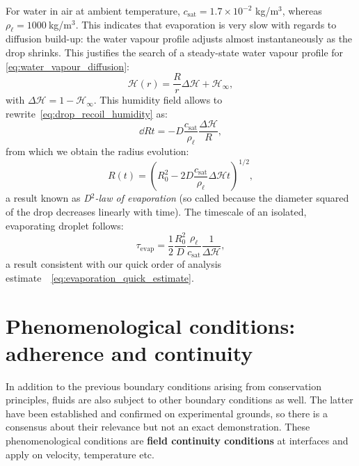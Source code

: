 For water in air at ambient temperature, $c_\text{sat} = 1.7 \times 10^{-2}$ kg/m$^3$, whereas $\rho_\ell = 1000~$kg/m$^3$. This indicates that evaporation is very slow with regards to diffusion build-up: the water vapour profile adjusts almost instantaneously as the drop shrinks. This justifies the search of a steady-state water vapour profile for \eqref{eq:water_vapour_diffusion}:
\begin{equation}
\mathcal H(r) = \frac{R}{r} \Delta \mathcal H + \mathcal H_\infty,
\end{equation}
with $\Delta \mathcal H = 1 - \mathcal H_\infty$.
This humidity field allows to rewrite~\eqref{eq:drop_recoil_humidity} as:
\begin{equation}
\dd{R}{t} = - D \frac{c_\text{sat}}{\rho_\ell} \frac{\Delta \mathcal H}{R},
\end{equation}
from which we obtain the radius evolution:
\begin{equation}
R(t) = \left(R_0^2 - 2 D \frac{c_\text{sat}}{\rho_\ell}\Delta \mathcal H t\right)^{1/2},
\end{equation}
a result known as \textit{D$^2$-law of evaporation} (so called because the diameter squared of the drop decreases linearly with time). The timescale of an isolated, evaporating droplet follows:
\begin{equation}
\tau_\text{evap} = \frac{1}{2}\frac{R_0^2}{D} \frac{\rho_\ell}{c_\text{sat}} \frac{1}{\Delta \mathcal H},
\end{equation}
a result consistent with our quick order of analysis estimate~ \eqref{eq:evaporation_quick_estimate}.
\section{Phenomenological conditions: adherence and continuity}
In addition to the previous boundary conditions arising from conservation principles, fluids are also subject to other boundary conditions as well. The latter have been established and confirmed on experimental grounds, so there is a consensus about their relevance but not an exact demonstration. These phenomenological conditions are \textbf{field continuity conditions} at interfaces and apply on velocity, temperature etc.

